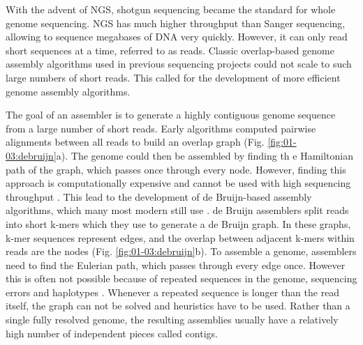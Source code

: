 With the advent of \acrfull{NGS}, shotgun sequencing became the standard for whole genome sequencing. \acrshort{NGS} has much higher throughput than Sanger sequencing, allowing to sequence megabases of DNA very quickly. However, it can only read short sequences at a time, referred to as \Gls{read}s. Classic overlap-based genome assembly algorithms used in previous sequencing projects could not scale to such large numbers of short reads. This called for the development of more efficient genome assembly algorithms.

The goal of an assembler is to generate a highly contiguous genome sequence from a large number of short reads. Early algorithms computed pairwise alignments between all reads to build an overlap graph (Fig. \ref{fig:01-03:debruijn}a). The genome could then be assembled by finding th e Hamiltonian path of the graph, which passes once through every node. However, finding this approach is computationally expensive and cannot be used with high sequencing throughput \cite{compeauHowApplyBruijn2011}. This lead to the development of de Bruijn-based assembly algorithms, which many most modern still use \citep{simpsonABySSParallelAssembler2009,zerbinoVelvetAlgorithmsNovo2008}. de Bruijn assemblers split reads into short \Gls{k-mer}s which they use to generate a de Bruijn graph. In these graphs, k-mer sequences represent edges, and the overlap between adjacent k-mers within reads are the nodes (Fig. \ref{fig:01-03:debruijn}b). To assemble a genome, assemblers need to find the Eulerian path, which passes through every edge once. However this is often not possible because of repeated sequences in the genome, sequencing errors and haplotypes \cite{simpsonTheoryPracticeGenome2015}. Whenever a repeated sequence is longer than the read itself, the graph can not be solved and heuristics have to be used. Rather than a single fully resolved genome, the resulting assemblies usually have a relatively high number of independent pieces called \Gls{contig}s.

